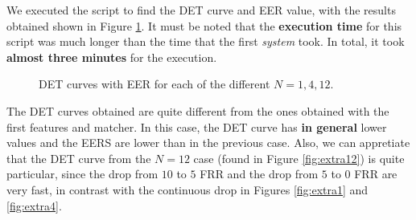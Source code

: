 \documentclass[a4paper]{article}
\begin{document}
{We executed the script to find the DET curve and EER value, with the results obtained shown in Figure \ref{fig:extra:DET}. It must be noted that the \textbf{execution time} for this script was much longer than the time that the first \emph{system} took. In total, it took \textbf{almost three minutes} for the execution.

\begin{figure}[H]
  \centering
  \qquad
  \qquad%
  \caption{DET curves with EER for each of the different \(N = 1,4,12\).}
  \label{fig:extra:DET}
\end{figure}


The DET curves obtained are quite different from the ones obtained with the first features and matcher. In this case, the DET curve has \textbf{in general} lower values and the EERS are lower than in the previous case. Also, we can appretiate that the DET curve from the \(N=12\) case (found in Figure \ref{fig:extra12}) is quite particular, since the drop from \(10\) to \(5\) FRR and the drop from \(5\) to \(0\) FRR are very fast, in contrast with the continuous drop in Figures \ref{fig:extra1} and \ref{fig:extra4}. \\

}
\end{document}
